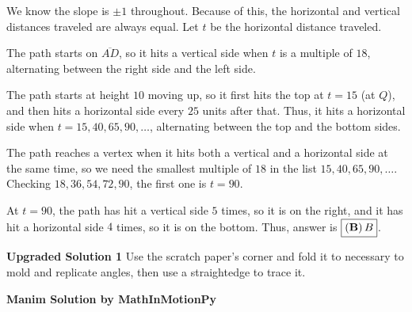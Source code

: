 \begin{enumerate}
 We know the slope is $\pm 1$ throughout. Because of this, the horizontal and vertical distances traveled are always equal. Let $t$ be the horizontal distance traveled.

 The path starts on $\overline{AD}$, so it hits a vertical side when $t$ is a multiple of $18$, alternating between the right side and the left side.

 The path starts at height $10$ moving up, so it first hits the top at $t=15$ (at $Q$), and then hits a horizontal side every $25$ units after that. Thus, it hits a horizontal side when $t = 15, 40, 65, 90, \ldots$, alternating between the top and the bottom sides.

 The path reaches a vertex when it hits both a vertical and a horizontal side at the same time, so we need the smallest multiple of $18$ in the list $15, 40, 65, 90, \ldots$. Checking $18, 36, 54, 72, 90$, the first one is $t=90$.

 At $t=90$, the path has hit a vertical side $5$ times, so it is on the right, and it has hit a horizontal side $4$ times, so it is on the bottom. Thus, answer is $\boxed{\mathbf{(B)\,\mathnormal{B}}}$.

 \textbf{Upgraded Solution 1} Use the scratch paper's corner and fold it to necessary to mold and replicate angles, then use a straightedge to trace it.

 \textbf{Manim Solution by MathInMotionPy} 


\end{enumerate}